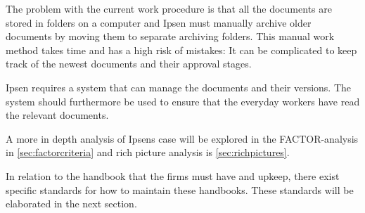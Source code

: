The problem with the current work procedure is that all the documents are stored in folders on a computer and Ipsen must manually archive older documents by moving them to separate archiving folders.
This manual work method takes time and has a high risk of mistakes: 
It can be complicated to keep track of the newest documents and their approval stages. 

Ipsen requires a system that can manage the documents and their versions.
The system should furthermore be used to ensure that the everyday workers have read the relevant documents.

A more in depth analysis of Ipsens case will be explored in the FACTOR-analysis in \cref{sec:factorcriteria} and rich picture analysis is \cref{sec:richpictures}.

In relation to the handbook that the firms must have and upkeep, there exist specific standards for how to maintain these handbooks.
These standards will be elaborated in the next section.

